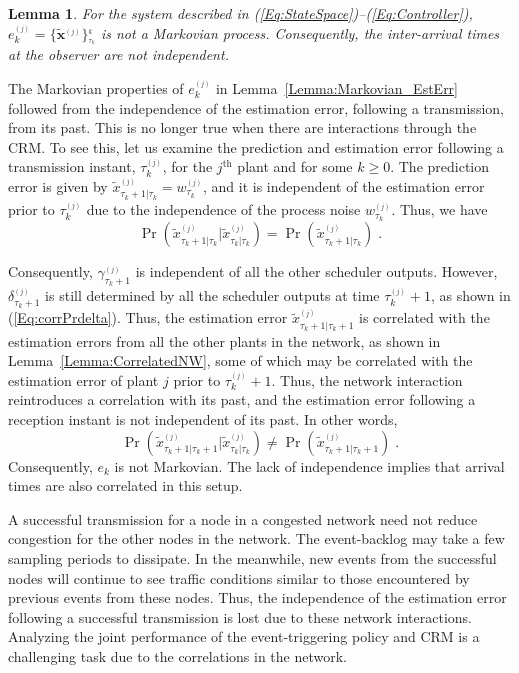 \documentclass[journal]{IEEEtran}
\newcommand{\vect}[1]{\bm{#1}} \newcommand{\D}{\displaystyle}
\newtheorem{lemma}[theorem]{Lemma}
\begin{document}
\begin{lemma} \label{Lemma:LostProp}
For the system described in (\ref{Eq:StateSpace})--(\ref{Eq:Controller}), $e^{_{(j)}}_k = \{\vect{\tilde{x}}^{_{(j)}}\}_{^{\tau_k}}^{_{k}}$ is not a Markovian process. Consequently, the inter-arrival times at the observer are not independent.
\end{lemma}
\begin{IEEEproof}
The Markovian properties of $e^{_{(j)}}_k$ in Lemma~\ref{Lemma:Markovian_EstErr} followed from the independence of the estimation error, following a transmission, from its past. This is no longer true when there are interactions through the CRM. To see this, let us examine the prediction and estimation error following a transmission instant, $\tau^{_{(j)}}_k$, for the $j^{\textrm{th}}$ plant and for some $k \ge 0$. The prediction error is given by $\tilde{x}^{_{(j)}}_{\tau_k+1|\tau_k} = w^{_{(j)}}_{\tau_k}$, and it is independent of the estimation error prior to $\tau^{_{(j)}}_k$ due to the independence of the process noise $w^{_{(j)}}_{\tau_k}$. Thus, we have
\begin{equation*}
\Pr(\tilde{x}^{_{(j)}}_{\tau_k+1|\tau_k} | \tilde{x}^{_{(j)}}_{\tau_k|\tau_k}) = \Pr(\tilde{x}^{_{(j)}}_{\tau_k+1|\tau_k}) \; .
\end{equation*}

Consequently, $\gamma^{_{(j)}}_{\tau_{k}+1}$ is independent of all the other scheduler outputs. However, $\delta^{_{(j)}}_{\tau_{k}+1}$ is still determined by all the scheduler outputs at time $\tau^{_{(j)}}_k + 1$, as shown in (\ref{Eq:corrPrdelta}). Thus, the estimation error $\tilde{x}^{_{(j)}}_{\tau_k+1|\tau_k + 1}$ is correlated with the estimation errors from all the other plants in the network, as shown in Lemma~\ref{Lemma:CorrelatedNW}, some of which may be correlated with the estimation error of plant $j$ prior to $\tau^{_{(j)}}_k + 1$. Thus, the network interaction reintroduces a correlation with its past, and the estimation error following a reception instant is not independent of its past. In other words,
\begin{equation*}
\Pr(\tilde{x}^{_{(j)}}_{\tau_k+1|\tau_k+1} | \tilde{x}^{_{(j)}}_{\tau_k|\tau_k}) \neq \Pr(\tilde{x}^{_{(j)}}_{\tau_k+1|\tau_k+1}) \; .
\end{equation*}
Consequently, $e_k$ is not Markovian. The lack of independence implies that arrival times are also correlated in this setup.
\end{IEEEproof}

A successful transmission for a node in a congested network need not reduce congestion for the other nodes in the network. The event-backlog may take a few sampling periods to dissipate. In the meanwhile, new events from the successful nodes will continue to see traffic conditions similar to those encountered by previous events from these nodes. Thus, the independence of the estimation error following a successful transmission is lost due to these network interactions. Analyzing the joint performance of the event-triggering policy and CRM is a challenging task due to the correlations in the network.
\end{document}
